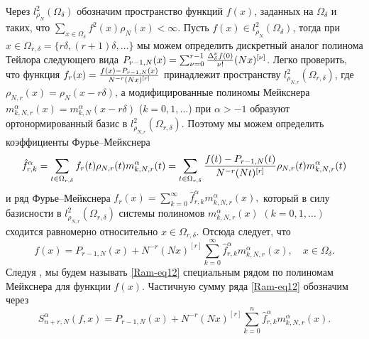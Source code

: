 Через $l_{\rho_N}^2(\Omega_\delta)$ обозначим пространство функций $f(x)$, заданных на $\Omega_\delta$ и таких, что $\sum_{x\in\Omega_\delta}f^2(x)\rho_N(x)<\infty$.
Пусть $f(x)\in l_{\rho_N}^2(\Omega_\delta)$, тогда при $x\in\Omega_{r,\delta}=\{r\delta, (r+1)\delta,\ldots\}$ мы можем определить дискретный аналог полинома Тейлора следующего вида
$P_{r-1,N}(x)=\sum_{\nu=0}^{r-1}{\Delta^{\nu}_{\delta}f(0)\over \nu!}(Nx)^{[\nu]}$.
Легко проверить, что функция $f_r(x)={{f(x)-P_{r-1,N}(x)}\over N^{-r}(Nx)^{[r]}}$ принадлежит пространству $l_{\rho_{N,r}}^2(\Omega_{r,\delta})$, где $\rho_{N,r}(x)=\rho_N(x-r\delta)$, а модифицированные полиномы Мейкснера $m_{k,N,r}^\alpha(x)=m_{k,N}^\alpha(x-r\delta)$ ($k=0, 1, \ldots$) при $\alpha>-1$
образуют ортонормированный базис в $l_{\rho_{N,r}}^2(\Omega_{r,\delta})$.
Поэтому мы можем определить коэффициенты Фурье--Мейкснера
$$
\hat{f}_{r,k}^\alpha=\sum_{t\in\Omega_{r,\delta}}f_r(t)\rho_{N,r}(t)m_{k,N,r}^\alpha(t)=
\sum_{t\in\Omega_{r,\delta}}{{f(t)-P_{r-1,N}(t)}\over N^{-r}(Nt)^{[r]}}\rho_{N,r}(t)m_{k,N,r}^\alpha(t)
$$
и ряд Фурье--Мейкснера
$
f_r(x)=\sum_{k=0}^\infty\hat{f}_{r,k}^\alpha m_{k,N,r}^\alpha(x),
$
который в силу базисности в $l_{\rho_{N,r}}^2(\Omega_{r,\delta})$ системы полиномов $m_{k,N,r}^\alpha(x)$ $(k=0, 1, \ldots)$ сходится равномерно относительно $x\in\Omega_{r,\delta}$.
Отсюда следует, что
\begin{equation}\label{Ram-eq12}
f(x)=P_{r-1,N}(x)+N^{-r}(Nx)^{[r]}\sum_{k=0}^\infty\hat{f}_{r,k}^\alpha m_{k,N,r}^\alpha(x), \quad x\in\Omega_\delta.
\end{equation}
 Следуя \cite{RamSar, RamVMJ}, мы будем называть \eqref{Ram-eq12} специальным рядом по полиномам Мейкснера для функции $f(x)$. Частичную сумму ряда \eqref{Ram-eq12} обозначим через
\begin{equation*}
S_{n+r,N}^\alpha(f,x)=P_{r-1,N}(x)+N^{-r}(Nx)^{[r]}\sum_{k=0}^{n}\hat{f}_{r,k}^\alpha m_{k,N,r}^\alpha(x).
\end{equation*}


